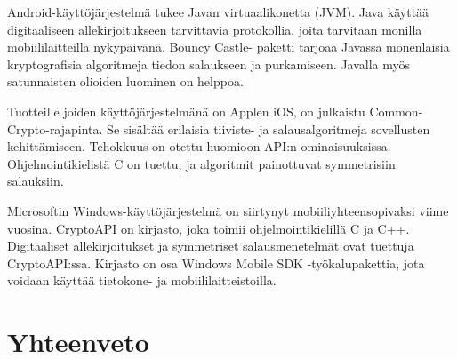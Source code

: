 \documentclass[finnish]{tktltiki2}
\theoremstyle{definition}
\theoremstyle{remark}
\begin{document}
Android-käyttöjärjestelmä tukee Javan virtuaalikonetta (JVM). Java käyttää digitaaliseen allekirjoitukseen tarvittavia protokollia, joita tarvitaan monilla mobiililaitteilla nykypäivänä. Bouncy Castle- paketti tarjoaa Javassa monenlaisia kryptografisia algoritmeja tiedon salaukseen ja purkamiseen. Javalla myös satunnaisten olioiden luominen on helppoa. \cite{enti}

Tuotteille joiden käyttöjärjestelmänä on Applen iOS, on julkaistu Common-Crypto-rajapinta. Se sisältää erilaisia tiiviste- ja salausalgoritmeja sovellusten kehittämiseen. Tehokkuus on otettu huomioon API:n ominaisuuksissa. Ohjelmointikielistä C on tuettu, ja algoritmit painottuvat symmetrisiin salauksiin. \cite{ios}

Microsoftin Windows-käyttöjärjestelmä on siirtynyt mobiiliyhteensopivaksi viime vuosina. CryptoAPI on kirjasto, joka 	toimii ohjelmointikielillä C ja C++. Digitaaliset allekirjoitukset ja symmetriset salausmenetelmät ovat tuettuja CryptoAPI:ssa.   Kirjasto on osa Windows Mobile SDK -työkalupakettia, jota voidaan käyttää tietokone- ja mobiililaitteistoilla. \cite{windows}
   

\section{Yhteenveto}  
\end{document}
